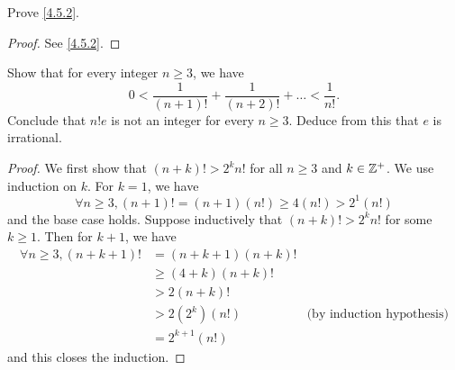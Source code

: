 \exercisesection

\begin{ex}\label{ex:4.5.1}
  Prove \cref{4.5.2}.
\end{ex}

\begin{proof}
  See \cref{4.5.2}.
\end{proof}

\begin{ex}\label{ex:4.5.2}
  Show that for every integer \(n \geq 3\), we have
  \[
    0 < \frac{1}{(n + 1)!} + \frac{1}{(n + 2)!} + \dots < \frac{1}{n!}.
  \]
  Conclude that \(n! e\) is not an integer for every \(n \geq 3\).
  Deduce from this that \(e\) is irrational.
\end{ex}

\begin{proof}
  We first show that \((n + k)! > 2^k n!\) for all \(n \geq 3\) and \(k \in \mathbb{Z}^+\).
  We use induction on \(k\).
  For \(k = 1\), we have
  \[
    \forall n \geq 3, (n + 1)! = (n + 1) (n!) \geq 4 (n!) > 2^1 (n!)
  \]
  and the base case holds.
  Suppose inductively that \((n + k)! > 2^k n!\) for some \(k \geq 1\).
  Then for \(k + 1\), we have
  \begin{align*}
    \forall n \geq 3, (n + k + 1)! & = (n + k + 1) (n + k)!                                    \\
                                   & \geq (4 + k)(n + k)!                                      \\
                                   & > 2 (n + k)!                                              \\
                                   & > 2 (2^k) (n!)         & \text{(by induction hypothesis)} \\
                                   & = 2^{k + 1} (n!)
  \end{align*}
  and this closes the induction.


\end{proof}
